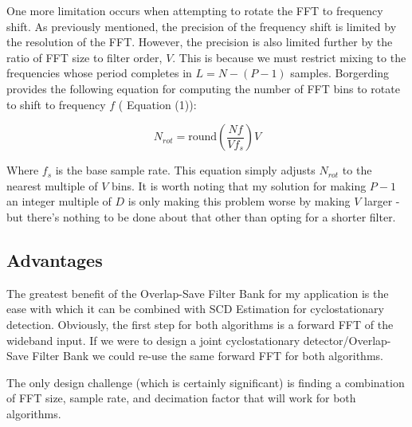 \documentclass[12pt]{report}
\begin{document}
One more limitation occurs when attempting to rotate the FFT to frequency shift.
As previously mentioned, the precision of the frequency shift is limited by the
resolution of the FFT. However, the precision is also limited further by the
ratio of FFT size to filter order, $V$. This is because we must restrict mixing
to the frequencies whose period completes in $L=N-(P-1)$ samples. Borgerding
provides the following equation for computing the number of FFT bins to rotate
to shift to frequency $f$ (\cite{Borgerding1} Equation (1)):

\begin{equation*}
    N_{rot} = \text{round}\left( \frac{Nf}{Vf_s} \right) V
\end{equation*}

Where $f_s$ is the base sample rate. This equation simply adjusts $N_{rot}$ to
the nearest multiple of $V$ bins. It is worth noting that my solution for
making $P-1$ an integer multiple of $D$ is only making this problem worse by
making $V$ larger - but there's nothing to be done about that other than opting
for a shorter filter.

\subsection{Advantages}
\label{sec:os_advantages}

The greatest benefit of the Overlap-Save Filter Bank for my application is
the ease with which it can be combined with SCD Estimation for cyclostationary
detection. Obviously, the first step for both algorithms is a forward FFT of the
wideband input. If we were to design a joint cyclostationary
detector/Overlap-Save Filter Bank we could re-use the same forward FFT for both
algorithms.

The only design challenge (which is certainly significant) is finding
a combination of FFT size, sample rate, and decimation factor that will work
for both algorithms.


\end{document}
